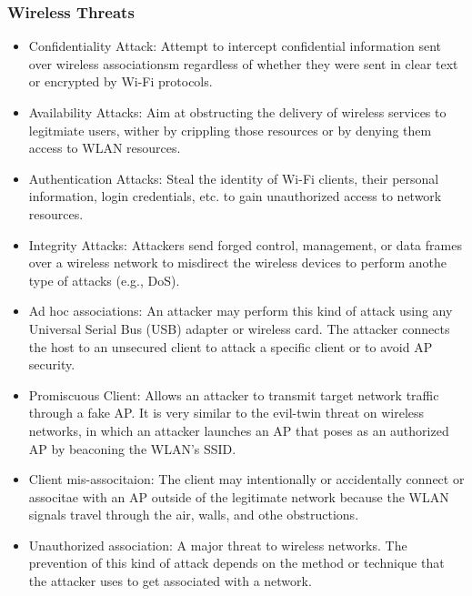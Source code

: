\subsubsection{Wireless Threats}
\begin{itemize}
    \item Confidentiality Attack: Attempt to intercept confidential information sent over wireless associationsm regardless of whether they were sent in clear text or encrypted by Wi-Fi protocols.
    \item Availability Attacks: Aim at obstructing the delivery of wireless services to legitmiate users, wither by crippling those resources or by denying them access to WLAN resources.
    \item Authentication Attacks: Steal the identity of Wi-Fi clients, their personal information, login credentials, etc. to gain unauthorized access to network resources.
    \item Integrity Attacks: Attackers send forged control, management, or data frames over a wireless network to misdirect the wireless devices to perform anothe type of attacks (e.g., DoS).
    \item Ad hoc associations: An attacker may perform this kind of attack using any Universal Serial Bus (USB) adapter or wireless card. The attacker connects the host to an unsecured client to attack a specific client or to avoid AP security.
    \item Promiscuous Client: Allows an attacker to transmit target network traffic through a fake AP. It is very similar to the evil-twin threat on wireless networks, in which an attacker launches an AP that poses as an authorized AP by beaconing the WLAN's SSID.
    \item Client mis-associtaion: The client may intentionally or accidentally connect or associtae with an AP outside of the legitimate network because the WLAN signals travel through the air, walls, and othe obstructions.
    \item Unauthorized association: A major threat to wireless networks. The prevention of this kind of attack depends on the method or technique that the attacker uses to get associated with a network.
\end{itemize}
